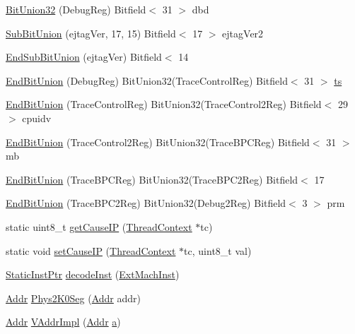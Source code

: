 \begin{DoxyCompactItemize}
\item 
\hyperlink{namespaceMipsISA_ab29959b11b97e2f28ab81dda7a828367}{BitUnion32} (DebugReg) Bitfield$<$ 31 $>$ dbd
\item 
\hyperlink{namespaceMipsISA_aada8c158cc81aa418c360bde1d4b9a59}{SubBitUnion} (ejtagVer, 17, 15) Bitfield$<$ 17 $>$ ejtagVer2
\item 
\hyperlink{namespaceMipsISA_ad1223c93dc1c573511a672beb68ed125}{EndSubBitUnion} (ejtagVer) Bitfield$<$ 14
\item 
\hyperlink{namespaceMipsISA_a74e5941d61677e3e49c387d644b057cb}{EndBitUnion} (DebugReg) BitUnion32(TraceControlReg) Bitfield$<$ 31 $>$ \hyperlink{namespaceMipsISA_a50fc899bd84a44263a9de45feb70b447}{ts}
\item 
\hyperlink{namespaceMipsISA_a8edb562d62f5bc109749bb5e5c51d9f1}{EndBitUnion} (TraceControlReg) BitUnion32(TraceControl2Reg) Bitfield$<$ 29 $>$ cpuidv
\item 
\hyperlink{namespaceMipsISA_af61b5ac7de0418d4ad6c186a7ca29d0c}{EndBitUnion} (TraceControl2Reg) BitUnion32(TraceBPCReg) Bitfield$<$ 31 $>$ mb
\item 
\hyperlink{namespaceMipsISA_a7a312f5d7bfedd7aeba964423eafec3d}{EndBitUnion} (TraceBPCReg) BitUnion32(TraceBPC2Reg) Bitfield$<$ 17
\item 
\hyperlink{namespaceMipsISA_a57be9529ca2847db116487077b34308f}{EndBitUnion} (TraceBPC2Reg) BitUnion32(Debug2Reg) Bitfield$<$ 3 $>$ prm
\item 
static uint8\_\-t \hyperlink{namespaceMipsISA_a3967e2ee4f1bfc61ff1c2486d15d0abc}{getCauseIP} (\hyperlink{classThreadContext}{ThreadContext} $\ast$tc)
\item 
static void \hyperlink{namespaceMipsISA_a86679a616188423fd4ee481c0c8badf5}{setCauseIP} (\hyperlink{classThreadContext}{ThreadContext} $\ast$tc, uint8\_\-t val)
\item 
\hyperlink{classRefCountingPtr}{StaticInstPtr} \hyperlink{namespaceMipsISA_a294cc8fc1febc2b191de37fe26cccecf}{decodeInst} (\hyperlink{namespaceMipsISA_aec686c38e40c7f794f1435591c15c275}{ExtMachInst})
\item 
\hyperlink{classm5_1_1params_1_1Addr}{Addr} \hyperlink{namespaceMipsISA_af5384b2f3700f6a096ef6b0ccb6dfe89}{Phys2K0Seg} (\hyperlink{classm5_1_1params_1_1Addr}{Addr} addr)
\item 
\hyperlink{classm5_1_1params_1_1Addr}{Addr} \hyperlink{namespaceMipsISA_ad4889586a6df5d65ddc6b5e084a79055}{VAddrImpl} (\hyperlink{classm5_1_1params_1_1Addr}{Addr} \hyperlink{namespaceMipsISA_ad15ace88a723e43c4e98c8c646891e79}{a})

\end{DoxyCompactItemize}
